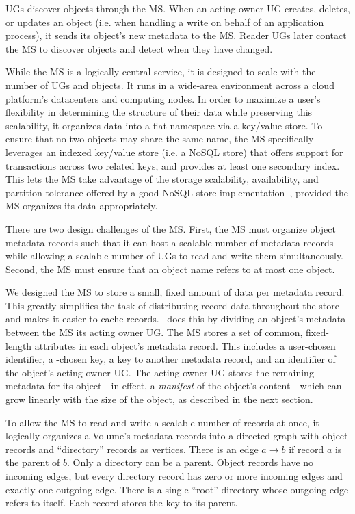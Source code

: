 UGs discover objects through the MS. When an acting owner UG creates, deletes, or updates an object (i.e. when handling a write on behalf of an application process), it sends its object's new metadata to the MS. Reader UGs later contact the MS to discover objects and detect when they have changed.

While the MS is a logically central service, it is designed to scale with the number of UGs and objects. It runs in a wide-area environment across a cloud platform's datacenters and computing nodes. In order to maximize a user's flexibility in determining the structure of their data while preserving this scalability, it organizes data into a flat namespace via a key/value store.  To ensure that no two objects may share the same name, the MS specifically leverages an indexed key/value store (i.e. a NoSQL store) that offers support for transactions across two related keys, and provides at least one secondary index. This lets the MS take advantage of the storage scalability, availability, and partition tolerance offered by a good NoSQL store implementation~\cite{bigtable,hyperdex}, provided the MS organizes its data appropriately.

There are two design challenges of the MS. First, the MS must organize object metadata records such that it can host a scalable number of metadata records while allowing a scalable number of UGs to read and write them simultaneously. Second, the MS must ensure that an object name refers to at most one object.

We designed the MS to store a small, fixed amount of data per metadata record. This greatly simplifies the task of distributing record data throughout the store and makes it easier to cache records. \Syndicate\ does this by dividing an object's metadata between the MS its acting owner UG. The MS stores a set of common, fixed-length attributes in each object's metadata record. This includes a user-chosen identifier, a \Syndicate-chosen key, a key to another metadata record, and an identifier of the object's acting owner UG. The acting owner UG stores the remaining metadata for its object---in effect, a \textit{manifest} of the object's content---which can grow linearly with the size of the object, as described in the next section.

To allow the MS to read and write a scalable number of records at once, it logically organizes a Volume's metadata records into a directed graph with object records and ``directory'' records as vertices. There is an edge $a \rightarrow b$ if record $a$ is the parent of $b$. Only a directory can be a parent. Object records have no incoming edges, but every directory record has zero or more incoming edges and exactly one outgoing edge. There is a single ``root'' directory whose outgoing edge refers to itself. Each record stores the key to its parent.

